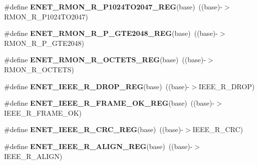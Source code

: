 \begin{DoxyCompactItemize}
\item 
\#define {\bfseries E\+N\+E\+T\+\_\+\+R\+M\+O\+N\+\_\+\+R\+\_\+\+P1024\+T\+O2047\+\_\+\+R\+EG}(base)~((base)-\/$>$R\+M\+O\+N\+\_\+\+R\+\_\+\+P1024\+T\+O2047)\hypertarget{group__ENET__Register__Accessor__Macros_ga23988c015a3df975f33ea8a476ad1b18}{}\label{group__ENET__Register__Accessor__Macros_ga23988c015a3df975f33ea8a476ad1b18}

\item 
\#define {\bfseries E\+N\+E\+T\+\_\+\+R\+M\+O\+N\+\_\+\+R\+\_\+\+P\+\_\+\+G\+T\+E2048\+\_\+\+R\+EG}(base)~((base)-\/$>$R\+M\+O\+N\+\_\+\+R\+\_\+\+P\+\_\+\+G\+T\+E2048)\hypertarget{group__ENET__Register__Accessor__Macros_ga805f1dc9ea7f653db8d30f95c8b84103}{}\label{group__ENET__Register__Accessor__Macros_ga805f1dc9ea7f653db8d30f95c8b84103}

\item 
\#define {\bfseries E\+N\+E\+T\+\_\+\+R\+M\+O\+N\+\_\+\+R\+\_\+\+O\+C\+T\+E\+T\+S\+\_\+\+R\+EG}(base)~((base)-\/$>$R\+M\+O\+N\+\_\+\+R\+\_\+\+O\+C\+T\+E\+TS)\hypertarget{group__ENET__Register__Accessor__Macros_ga5e2ea20f4223e78adf4e727d4d33c342}{}\label{group__ENET__Register__Accessor__Macros_ga5e2ea20f4223e78adf4e727d4d33c342}

\item 
\#define {\bfseries E\+N\+E\+T\+\_\+\+I\+E\+E\+E\+\_\+\+R\+\_\+\+D\+R\+O\+P\+\_\+\+R\+EG}(base)~((base)-\/$>$I\+E\+E\+E\+\_\+\+R\+\_\+\+D\+R\+OP)\hypertarget{group__ENET__Register__Accessor__Macros_gaba8d35a5b6d0b054580c49fc237b2e7e}{}\label{group__ENET__Register__Accessor__Macros_gaba8d35a5b6d0b054580c49fc237b2e7e}

\item 
\#define {\bfseries E\+N\+E\+T\+\_\+\+I\+E\+E\+E\+\_\+\+R\+\_\+\+F\+R\+A\+M\+E\+\_\+\+O\+K\+\_\+\+R\+EG}(base)~((base)-\/$>$I\+E\+E\+E\+\_\+\+R\+\_\+\+F\+R\+A\+M\+E\+\_\+\+OK)\hypertarget{group__ENET__Register__Accessor__Macros_ga26628f4b128a268c3ad7a83dd77fc7fa}{}\label{group__ENET__Register__Accessor__Macros_ga26628f4b128a268c3ad7a83dd77fc7fa}

\item 
\#define {\bfseries E\+N\+E\+T\+\_\+\+I\+E\+E\+E\+\_\+\+R\+\_\+\+C\+R\+C\+\_\+\+R\+EG}(base)~((base)-\/$>$I\+E\+E\+E\+\_\+\+R\+\_\+\+C\+RC)\hypertarget{group__ENET__Register__Accessor__Macros_ga613fb96e0af919172f1b69a978d431da}{}\label{group__ENET__Register__Accessor__Macros_ga613fb96e0af919172f1b69a978d431da}

\item 
\#define {\bfseries E\+N\+E\+T\+\_\+\+I\+E\+E\+E\+\_\+\+R\+\_\+\+A\+L\+I\+G\+N\+\_\+\+R\+EG}(base)~((base)-\/$>$I\+E\+E\+E\+\_\+\+R\+\_\+\+A\+L\+I\+GN)\hypertarget{group__ENET__Register__Accessor__Macros_ga51467d6f2f1d8d32ed1890a6403e330a}{}\label{group__ENET__Register__Accessor__Macros_ga51467d6f2f1d8d32ed1890a6403e330a}


\end{DoxyCompactItemize}
